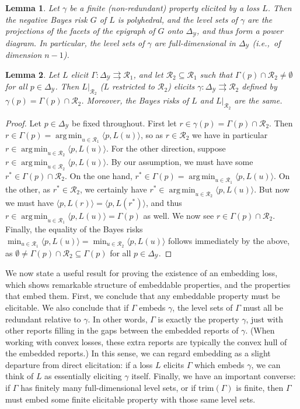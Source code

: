 \documentclass[12pt]{article}
\newcommand{\simplex}{\Delta_\Y}
\newcommand{\R}{\mathcal{R}}
\newcommand{\Y}{\mathcal{Y}}
\newcommand{\inprod}[2]{\langle #1, #2 \rangle}%
\newcommand{\toto}{\rightrightarrows}
\newcommand{\trim}{\mathrm{trim}}
\DeclareMathOperator*{\argmin}{arg\,min}
\newtheorem{lemma}{Lemma}
\begin{document}
\begin{lemma}\label{lem:finite-full-dim}
	Let $\gamma$ be a finite (non-redundant) property elicited by a loss $L$.
	Then the negative Bayes risk $G$ of $L$ is polyhedral, and the level sets of $\gamma$ are the projections of the facets of the epigraph of $G$ onto $\simplex$, and thus form a power diagram.
	In particular, the level sets of $\gamma$ are full-dimensional in $\simplex$ (i.e.,\ of dimension $n-1$).
\end{lemma}

\begin{lemma}\label{lem:loss-restrict}
	Let $L$ elicit $\Gamma:\simplex\toto\R_1$, and let $\R_2\subseteq\R_1$ such that $\Gamma(p) \cap \R_2 \neq \emptyset$ for all $p\in\simplex$.
	Then $L|_{\R_2}$ ($L$ restricted to $\R_2$) elicits $\gamma:\simplex\toto\R_2$ defined by $\gamma(p) = \Gamma(p)\cap \R_2$.
	Moreover, the Bayes risks of $L$ and $L|_{\R_2}$ are the same.
\end{lemma}
\begin{proof}
	Let $p\in\simplex$ be fixed throughout.
	First let $r \in \gamma(p) = \Gamma(p) \cap \R_2$.
	Then $r \in \Gamma(p) = \argmin_{u\in\R_1} \inprod{p}{L(u)}$, so as $r\in\R_2$ we have in particular $r \in \argmin_{u\in\R_2} \inprod{p}{L(u)}$.
	For the other direction, suppose $r \in \argmin_{u\in\R_2} \inprod{p}{L(u)}$.
	By our assumption, we must have some $r^* \in \Gamma(p) \cap \R_2$.
	On the one hand, $r^*\in\Gamma(p) = \argmin_{u\in\R_1} \inprod{p}{L(u)}$.
	On the other, as $r^* \in \R_2$, we certainly have $r^* \in \argmin_{u\in\R_2} \inprod{p}{L(u)}$.
	But now we must have $\inprod{p}{L(r)} = \inprod{p}{L(r^*)}$, and thus $r \in \argmin_{u\in\R_1} \inprod{p}{L(u)} = \Gamma(p)$ as well.
	We now see $r \in \Gamma(p) \cap \R_2$.
	Finally, the equality of the Bayes risks $\min_{u\in\R_1} \inprod{p}{L(u)} = \min_{u\in\R_2} \inprod{p}{L(u)}$ follows immediately by the above, as $\emptyset \neq \Gamma(p)\cap\R_2 \subseteq \Gamma(p)$ for all $p\in\simplex$.
\end{proof}

We now state a useful result for proving the existence of an embedding loss, which shows remarkable structure of embeddable properties, and the properties that embed them.
First, we conclude that any embeddable property must be elicitable.
We also conclude that if $\Gamma$ embeds $\gamma$, the level sets of $\Gamma$ must all be redundant relative to $\gamma$.
In other words, $\Gamma$ is exactly the property $\gamma$, just with other reports filling in the gaps between the embedded reports of $\gamma$.
(When working with convex losses, these extra reports are typically the convex hull of the embedded reports.)
In this sense, we can regard embedding as a slight departure from direct elicitation: if a loss $L$ elicits $\Gamma$ which embeds $\gamma$, we can think of $L$ as essentially eliciting $\gamma$ itself.
Finally, we have an important converse: if $\Gamma$ has finitely many full-dimensional level sets, or if $\trim(\Gamma)$ is finite, then $\Gamma$ must embed some finite elicitable property with those same level sets.
\end{document}
